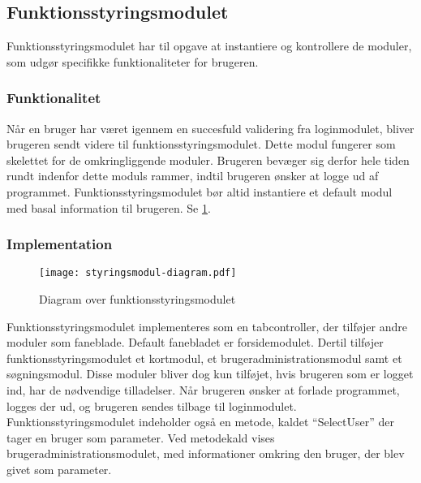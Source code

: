 \subsection{Funktionsstyringsmodulet}
\label{sub:styringsmodul}

Funktionsstyringsmodulet har til opgave at instantiere og kontrollere de moduler, som udgør specifikke funktionaliteter for brugeren.

\subsubsection{Funktionalitet}
\label{ssub:hovedmodul_funktionalitet}

Når en bruger har været igennem en succesfuld validering fra loginmodulet, bliver brugeren sendt videre til funktionsstyringsmodulet. Dette modul fungerer som skelettet for de omkringliggende moduler. Brugeren bevæger sig derfor hele tiden rundt indenfor dette moduls rammer, indtil brugeren ønsker at logge ud af programmet. Funktionsstyringsmodulet bør altid instantiere et default modul med basal information til brugeren. Se \cref{fig:styring}.

\subsubsection{Implementation}
\label{ssub:hovedmodul_implementation}

\begin{figure}
  \centering
  \texttt{[image: styringsmodul-diagram.pdf]}
  \caption{Diagram over funktionsstyringsmodulet} \label{fig:styring}
\end{figure}

Funktionsstyringsmodulet implementeres som en tabcontroller, der tilføjer andre moduler som faneblade. Default fanebladet er forsidemodulet. Dertil tilføjer funktionsstyringsmodulet et kortmodul, et brugeradministrationsmodul samt et søgningsmodul. Disse moduler bliver dog kun tilføjet, hvis brugeren som er logget ind, har de nødvendige tilladelser. Når brugeren ønsker at forlade programmet, logges der ud, og brugeren sendes tilbage til loginmodulet. Funktionsstyringsmodulet indeholder også en metode, kaldet \enquote{SelectUser} der tager en bruger som parameter. Ved metodekald vises brugeradministrationsmodulet, med informationer omkring den bruger, der blev givet som parameter. 
